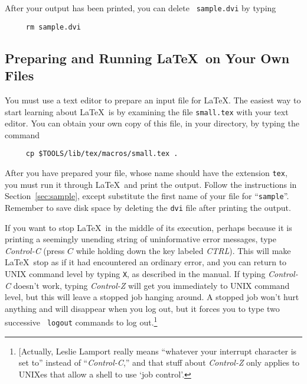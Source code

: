 After your output has been printed, you can delete \mbox{\tt
sample.dvi} by typing
\begin{verbatim}
     rm sample.dvi
\end{verbatim}

\subsection{Preparing and Running \LaTeX\ on Your Own Files}

You must use a text editor to prepare an input file for
\LaTeX.
The easiest way to start learning about \LaTeX\ is by
examining the file \mbox{\tt small.tex} with your text editor.
You can obtain your own copy of this file, in your directory,
by typing the command
\begin{verbatim}
     cp $TOOLS/lib/tex/macros/small.tex .
\end{verbatim}

After you have prepared your file, whose name should have the extension
{\tt tex}, you must run it through \LaTeX\ and print the output.
Follow the instructions in Section~\ref{sec:sample}, except substitute
the first name of your file for ``\mbox{\tt sample}''.  Remember to
save disk space by deleting the {\tt dvi} file after printing the
output.



If you want to stop \LaTeX\ in the middle of its execution, perhaps
because it is printing a seemingly unending string of uninformative
error messages, type {\em Control-C\/} (press $C$ while holding down
the key labeled {\em CTRL\/}).  This will make \LaTeX\ stop as if it
had encountered an ordinary error, and you can return to UNIX command
level by typing {\tt X}, as described in the manual.  If typing {\em
Control-C\/} doesn't work, typing {\em Control-Z\/} will get you
immediately to UNIX command level, but this will leave a stopped job
hanging around.  A stopped job won't hurt anything and will disappear
when you log out, but it forces you to type two successive \mbox{\tt
logout} commands to log out.\footnote{ [Actually, Leslie Lamport
really means ``whatever your interrupt character is set to'' instead
of ``{\em Control-C\/},'' and that stuff about {\em Control-Z\/} only
applies to UNIXes that allow a shell to use `job control'.}

